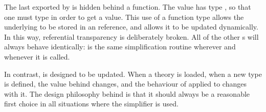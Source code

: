 The last \simpset{} exported by  is hidden behind a
function.  The  value has type , so
that one must type  in order to get a \simpset{} value.
This use of a function type allows the underlying \simpset{} to be
stored in an \ML{} reference, and allows it to be updated
dynamically.  In this way, referential transparency is deliberately
broken.  All of the other \simpset{}s will always behave identically:
 is the same simplification routine wherever
and whenever it is called.

In contrast,  is designed to be updated.  When a theory is
loaded, when a new type is defined, the value behind 
changes, and the behaviour of  applied to
 changes with it.  The design philosophy behind
 is that it should always be a reasonable first choice in
all situations where the simplifier is used.

